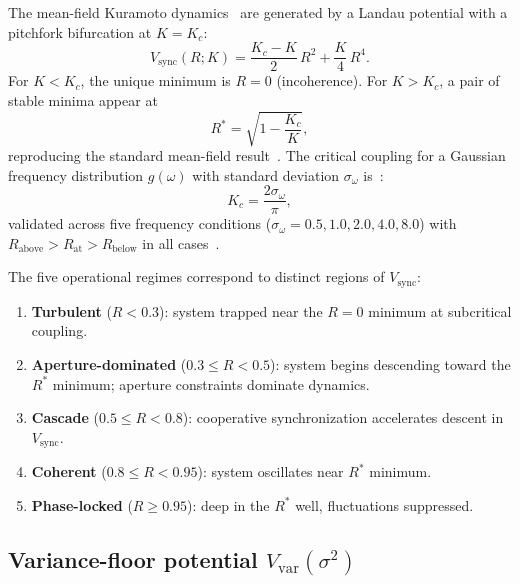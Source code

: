 \documentclass[twocolumn,aps,prl,superscriptaddress,floatfix]{revtex4-2}
\newcommand{\Kc}{K_c}
\begin{document}
The mean-field Kuramoto dynamics~\cite{kuramoto1975,strogatz2000} are generated by a Landau potential with a pitchfork bifurcation at $K = \Kc$:
\begin{equation}
V_{\mathrm{sync}}(R; K) = \frac{\Kc - K}{2}\,R^2 + \frac{K}{4}\,R^4.
\label{eq:vsync}
\end{equation}
For $K < \Kc$, the unique minimum is $R = 0$ (incoherence).
For $K > \Kc$, a pair of stable minima appear at
\begin{equation}
R^* = \sqrt{1 - \frac{\Kc}{K}},
\label{eq:Rstar}
\end{equation}
reproducing the standard mean-field result~\cite{acebron2005}.
The critical coupling for a Gaussian frequency distribution $g(\omega)$ with standard deviation $\sigma_\omega$ is~\cite{kuramoto1975}:
\begin{equation}
\Kc = \frac{2\sigma_\omega}{\pi},
\label{eq:Kc}
\end{equation}
validated across five frequency conditions ($\sigma_\omega = 0.5, 1.0, 2.0, 4.0, 8.0$) with $R_{\mathrm{above}} > R_{\mathrm{at}} > R_{\mathrm{below}}$ in all cases~\cite{sachikonye2026operator}.

The five operational regimes correspond to distinct regions of $V_{\mathrm{sync}}$:
\begin{enumerate}
    \item \textbf{Turbulent} ($R < 0.3$): system trapped near the $R = 0$ minimum at subcritical coupling.
    \item \textbf{Aperture-dominated} ($0.3 \leq R < 0.5$): system begins descending toward the $R^*$ minimum; aperture constraints dominate dynamics.
    \item \textbf{Cascade} ($0.5 \leq R < 0.8$): cooperative synchronization accelerates descent in $V_{\mathrm{sync}}$.
    \item \textbf{Coherent} ($0.8 \leq R < 0.95$): system oscillates near $R^*$ minimum.
    \item \textbf{Phase-locked} ($R \geq 0.95$): deep in the $R^*$ well, fluctuations suppressed.
\end{enumerate}

\subsection{Variance-floor potential $V_{\mathrm{var}}(\sigma^2)$}
\label{sec:vvar}
\end{document}
